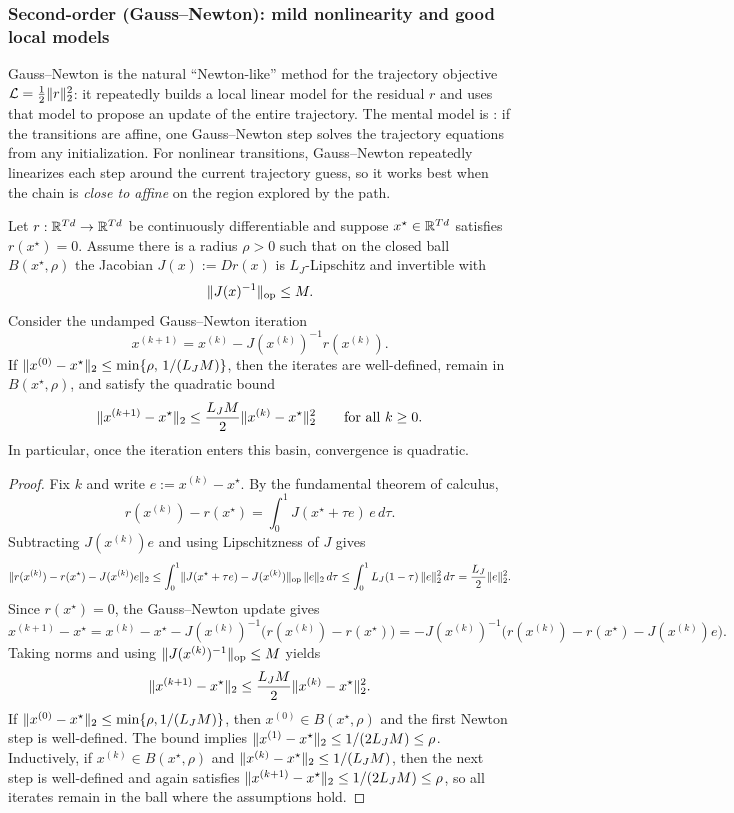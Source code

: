 \documentclass[11pt]{article}
\begin{document}
\subsubsection{Second-order (Gauss--Newton): mild nonlinearity and good local models}
\label{subsubsec:when-works-newton}

Gauss--Newton is the natural ``Newton-like'' method for the trajectory objective $\mathcal{L}=\tfrac12\lVert r\rVert_2^2$:
it repeatedly builds a local linear model for the residual $r$ and uses that model to propose an update of the entire trajectory.
The mental model is :
if the transitions are affine, one Gauss--Newton step solves the trajectory equations from any initialization.
For nonlinear transitions, Gauss--Newton repeatedly linearizes each step around the current trajectory guess, so it works best when the chain is \emph{close to affine} on the region explored by the path.

\begin{proposition}
\label{prop:gauss-newton-quadratic}
Let $r:\mathbb{R}^{Td}\to\mathbb{R}^{Td}$ be continuously differentiable and suppose $x^\star\in\mathbb{R}^{Td}$ satisfies $r(x^\star)=0$.
Assume there is a radius $\rho>0$ such that on the closed ball $B(x^\star,\rho)$ the Jacobian $J(x):=Dr(x)$ is $L_J$-Lipschitz and invertible with
\[
  \lVert J(x)^{-1}\rVert_{\mathrm{op}} \le M.
\]
Consider the undamped Gauss--Newton iteration
\[
  x^{(k+1)} = x^{(k)} - J(x^{(k)})^{-1} r(x^{(k)}).
\]
If $\lVert x^{(0)}-x^\star\rVert_2 \le \min\{\rho,\,1/(L_J M)\}$, then the iterates are well-defined, remain in $B(x^\star,\rho)$, and satisfy the quadratic bound
\[
  \lVert x^{(k+1)}-x^\star\rVert_2 \le \frac{L_J M}{2}\lVert x^{(k)}-x^\star\rVert_2^2
  \qquad\text{for all }k\ge 0.
\]
In particular, once the iteration enters this basin, convergence is quadratic.
\end{proposition}
\begin{proof}
Fix $k$ and write $e:=x^{(k)}-x^\star$.
By the fundamental theorem of calculus,
\[
r(x^{(k)})-r(x^\star)=\int_0^1 J(x^\star+\tau e)\,e\,d\tau.
\]
Subtracting $J(x^{(k)})e$ and using Lipschitzness of $J$ gives
\[
\lVert r(x^{(k)})-r(x^\star)-J(x^{(k)})e\rVert_2
\le \int_0^1 \lVert J(x^\star+\tau e)-J(x^{(k)})\rVert_{\mathrm{op}}\,\lVert e\rVert_2\,d\tau
\le \int_0^1 L_J(1-\tau)\,\lVert e\rVert_2^2\,d\tau
=\frac{L_J}{2}\lVert e\rVert_2^2.
\]
Since $r(x^\star)=0$, the Gauss--Newton update gives
\[
x^{(k+1)}-x^\star
  = x^{(k)}-x^\star - J(x^{(k)})^{-1}\bigl(r(x^{(k)})-r(x^\star)\bigr)
  = -J(x^{(k)})^{-1}\!\bigl(r(x^{(k)})-r(x^\star)-J(x^{(k)})e\bigr).
\]
Taking norms and using $\lVert J(x^{(k)})^{-1}\rVert_{\mathrm{op}}\le M$ yields
\[
\lVert x^{(k+1)}-x^\star\rVert_2 \le \frac{L_JM}{2}\lVert x^{(k)}-x^\star\rVert_2^2.
\]
If $\lVert x^{(0)}-x^\star\rVert_2\le \min\{\rho,1/(L_JM)\}$, then $x^{(0)}\in B(x^\star,\rho)$ and the first Newton step is well-defined.
The bound implies $\lVert x^{(1)}-x^\star\rVert_2\le 1/(2L_JM)\le \rho$.
Inductively, if $x^{(k)}\in B(x^\star,\rho)$ and $\lVert x^{(k)}-x^\star\rVert_2\le 1/(L_JM)$, then the next step is well-defined and again satisfies $\lVert x^{(k+1)}-x^\star\rVert_2\le 1/(2L_JM)\le \rho$, so all iterates remain in the ball where the assumptions hold.%
\end{proof}
\end{document}
